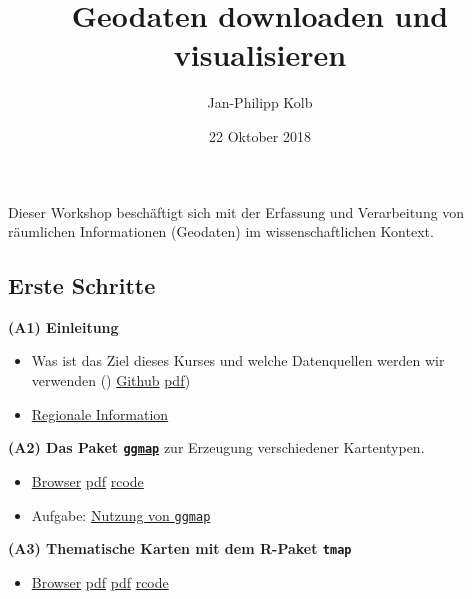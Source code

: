 \documentclass[ignorenonframetext,]{beamer}
\title{Geodaten downloaden und visualisieren}
\author{Jan-Philipp Kolb}
\date{22 Oktober 2018}
\providecommand{\tightlist}{%
  \setlength{\itemsep}{0pt}\setlength{\parskip}{0pt}}
\begin{document}
\frame{\titlepage}

\begin{frame}

Dieser Workshop beschäftigt sich mit der Erfassung und Verarbeitung von
räumlichen Informationen (Geodaten) im wissenschaftlichen Kontext.

\end{frame}

\hypertarget{erste-schritte}{%
\subsection{Erste Schritte}\label{erste-schritte}}

\begin{frame}{\textbf{(A1) Einleitung}}
\protect\hypertarget{a1-einleitung}{}

\begin{itemize}
\tightlist
\item
  Was ist das Ziel dieses Kurses und welche Datenquellen werden wir
  verwenden () \href{slides/Intro.md}{Github} \textbar{}
  \href{slides/Intro.pdf}{pdf})
\item
  \href{http://rpubs.com/Japhilko82/mapFirenze}{Regionale Information}
\end{itemize}

\end{frame}

\begin{frame}[fragile]{\textbf{(A2) Das Paket
\href{http://journal.r-project.org/archive/2013-1/kahle-wickham.pdf}{\texttt{ggmap}}}
zur Erzeugung verschiedener Kartentypen.}
\protect\hypertarget{a2-das-paket-ggmap-zur-erzeugung-verschiedener-kartentypen.}{}

\begin{itemize}
\tightlist
\item
  \href{slides/ggmap.md}{Browser} \textbar{}
  \href{slides/ggmap.pdf}{pdf} \textbar{} \href{slides/ggmap.R}{rcode}
\item
  Aufgabe: \href{exercises/Aufgabe_Nutzung_ggmap.Rmd}{Nutzung von
  \texttt{ggmap}}
\end{itemize}

\end{frame}

\begin{frame}{\textbf{(A3) Thematische Karten mit dem R-Paket
\texttt{tmap}}}
\protect\hypertarget{a3-thematische-karten-mit-dem-r-paket-tmap}{}

\begin{itemize}
\tightlist
\item
  \href{slides/tmap.md}{Browser} \textbar{} \href{slides/tmap.pdf}{pdf}
  \textbar{} \href{slides/tmap.pdf}{pdf} \textbar{}
  \href{rcode/tmap.R}{rcode}
\end{itemize}

\end{frame}
\end{document}

